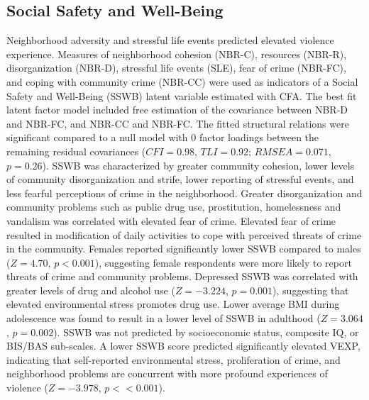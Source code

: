 \documentclass[utf8]{frontiersSCNS} %
\begin{document}
\subsection{Social Safety and Well-Being} Neighborhood adversity and stressful life events predicted elevated violence experience. Measures of neighborhood cohesion (NBR-C), resources (NBR-R), disorganization (NBR-D), stressful life events (SLE), fear of crime (NBR-FC), and coping with community crime (NBR-CC) were used as indicators of a Social Safety and Well-Being (SSWB) latent variable estimated with CFA. The best fit latent factor model included free estimation of the covariance between NBR-D and NBR-FC, and NBR-CC and NBR-FC. The fitted structural relations were significant compared to a null model with $0$ factor loadings between the remaining residual covariances ($CFI=0.98$, $TLI=0.92$; $RMSEA=0.071$, $p=0.26$). SSWB was characterized by greater community cohesion, lower levels of community disorganization and strife, lower reporting of stressful events, and less fearful perceptions of crime in the neighborhood. Greater disorganization and community problems such as public drug use, prostitution, homelessness and vandalism was correlated with elevated fear of crime. Elevated fear of crime resulted in modification of daily activities to cope with perceived threats of crime in the community. Females reported significantly lower SSWB compared to males ($Z=4.70$, $p<0.001$), suggesting female respondents were more likely to report threats of crime and community problems. Depressed SSWB was correlated with greater levels of drug and alcohol use ($Z=-3.224$, $p=0.001$), suggesting that elevated environmental stress promotes drug use. Lower average BMI during adolescence was found to result in a lower level of SSWB in adulthood ($Z=3.064$, $p=0.002$). SSWB was not predicted by socioeconomic status, composite IQ, or BIS/BAS sub-scales. A lower SSWB score predicted significantly elevated VEXP, indicating that self-reported environmental stress, proliferation of crime, and neighborhood problems are concurrent with more profound experiences of violence ($Z=-3.978$, $p<<0.001$). 
\end{document}
